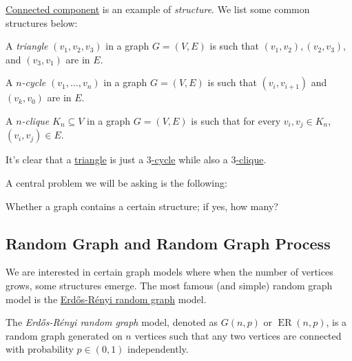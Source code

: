 \hyperref[def:connected-component]{Connected component} is an example of \emph{structure}. We list some common structures below:

\begin{definition}[Triangle]\label{def:triangle}
	A \emph{triangle} \((v_1, v_2, v_3)\) in a graph \(G = (V, E)\) is such that \((v_1, v_2), (v_2, v_3)\), and \((v_3, v_1)\) are in \(E\).
\end{definition}

\begin{definition}[Cycle]\label{def:cycle}
	A \emph{\(n\)-cycle} \((v_1, \dots , v_n)\) in a graph \(G = (V, E)\) is such that \((v_i, v_{i+1})\) and \((v_k, v_0)\) are in \(E\).
\end{definition}

\begin{definition}[Clique]\label{def:clique}
	A \emph{\(n\)-clique} \(K_n \subseteq V\) in a graph \(G = (V, E)\) is such that for every \(v_i, v_j \in K_n\), \((v_i, v_j) \in E\).
\end{definition}

\begin{eg}
	It's clear that a \hyperref[def:triangle]{triangle} is just a \hyperref[def:cycle]{\(3\)-cycle} while also a \hyperref[def:clique]{\(3\)-clique}.
\end{eg}

A central problem we will be asking is the following:

\begin{problem*}
	Whether a graph contains a certain structure; if yes, how many?
\end{problem*}

\subsection{Random Graph and Random Graph Process}
We are interested in certain graph models where when the number of vertices grows, some structures emerge. The most famous (and simple) random graph model is the \hyperref[def:Erdős-Rényi-random-graph]{Erdős-Rényi random graph} model.

\begin{definition}\label{def:Erdős-Rényi-random-graph}
	The \emph{Erdős-Rényi random graph} model, denoted as \(G(n, p)\) or \(\operatorname{ER}(n, p) \), is a random graph generated on \(n\) vertices such that any two vertices are connected with probability \(p \in (0, 1)\) independently.
\end{definition}

